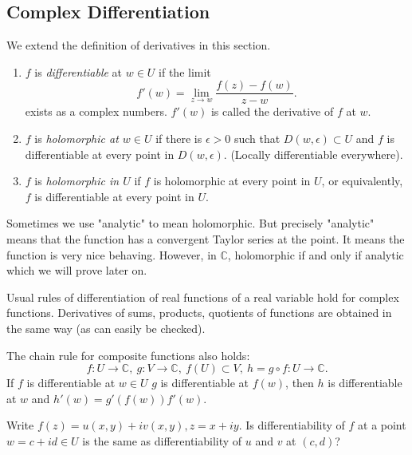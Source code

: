 \subsection{Complex Differentiation}
We extend the definition of derivatives in this section.
\begin{definition}
    \begin{enumerate}
        We have some definitions of differentiation in \(\mathbb{C}\) .
        \item \(f\) is \textit{differentiable} at \(w \in U\) if the limit
        \[
            f'(w)=\lim\limits_{z \to w}\frac{f(z)-f(w)}{z-w}.
        \]
        exists as a complex numbers. \(f'(w)\) is called the derivative of \(f\) at \(w\).
        \item \(f\) is \textit{holomorphic at \(w \in U\)} if there is \(\epsilon>0\) such that \(D(w, \epsilon) \subset U\) and \(f\) is differentiable at every point in \(D(w, \epsilon)\). (Locally differentiable everywhere).
        \item \(f\)  is \textit{holomorphic in \(U\)} if \(f\) is holomorphic at every point in \(U\), or equivalently, \(f\) is differentiable at every point in \(U\).
    \end{enumerate}
\end{definition}
\begin{remark}
    Sometimes we use "analytic" to mean holomorphic. But precisely "analytic" means that the function has a convergent Taylor series at the point. It means the function is very nice behaving. However, in \(\mathbb{C}\), holomorphic if and only if analytic which we will prove later on.
\end{remark}
Usual rules of differentiation of real functions of a real variable hold for complex functions. Derivatives of sums, products, quotients of functions are obtained in the same way (as can easily be checked).

The chain rule for composite functions also holds:
\[
    f:U\to\mathbb{C},~g:V\to \mathbb{C},~f(U)\subset V,~h=g\circ f:U \to \mathbb{C}.
\]
If \(f\) is differentiable at \(w \in U\) \(g\) is differentiable at \(f(w)\), then \(h\) is differentiable at \(w\) and \(h'(w)=g'(f(w))f'(w)\).

\begin{problem}
    Write \(f(z) = u(x,y)+iv(x,y),z=x+iy\). Is differentiability of \(f\) at a point \(w = c + id \in U\) is the same as differentiability of \(u\) and \(v\) at \((c,d)\)?
\end{problem}

